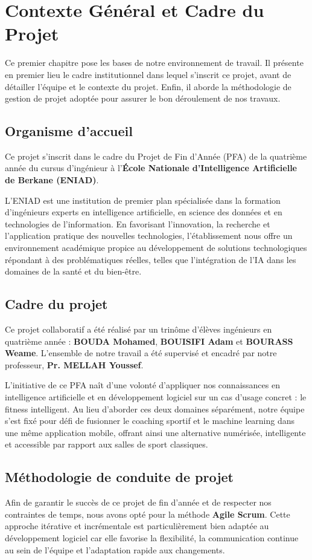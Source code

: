 \chapter{Contexte Général et Cadre du Projet}

Ce premier chapitre pose les bases de notre environnement de travail. Il présente en premier lieu le cadre institutionnel dans lequel s'inscrit ce projet, avant de détailler l'équipe et le contexte du projet. Enfin, il aborde la méthodologie de gestion de projet adoptée pour assurer le bon déroulement de nos travaux.

\section{Organisme d'accueil}
Ce projet s'inscrit dans le cadre du Projet de Fin d'Année (PFA) de la quatrième année du cursus d'ingénieur à l'\textbf{École Nationale d'Intelligence Artificielle de Berkane (ENIAD)}.

L'ENIAD est une institution de premier plan spécialisée dans la formation d'ingénieurs experts en intelligence artificielle, en science des données et en technologies de l'information. En favorisant l'innovation, la recherche et l'application pratique des nouvelles technologies, l'établissement nous offre un environnement académique propice au développement de solutions technologiques répondant à des problématiques réelles, telles que l'intégration de l'IA dans les domaines de la santé et du bien-être.

\section{Cadre du projet}
Ce projet collaboratif a été réalisé par un trinôme d'élèves ingénieurs en quatrième année : \textbf{BOUDA Mohamed}, \textbf{BOUISIFI Adam} et \textbf{BOURASS Weame}. L'ensemble de notre travail a été supervisé et encadré par notre professeur, \textbf{Pr. MELLAH Youssef}.

L'initiative de ce PFA naît d'une volonté d'appliquer nos connaissances en intelligence artificielle et en développement logiciel sur un cas d'usage concret : le fitness intelligent. Au lieu d'aborder ces deux domaines séparément, notre équipe s'est fixé pour défi de fusionner le coaching sportif et le machine learning dans une même application mobile, offrant ainsi une alternative numérisée, intelligente et accessible par rapport aux salles de sport classiques.

\section{Méthodologie de conduite de projet}
Afin de garantir le succès de ce projet de fin d'année et de respecter nos contraintes de temps, nous avons opté pour la méthode \textbf{Agile Scrum}. Cette approche itérative et incrémentale est particulièrement bien adaptée au développement logiciel car elle favorise la flexibilité, la communication continue au sein de l'équipe et l'adaptation rapide aux changements.

